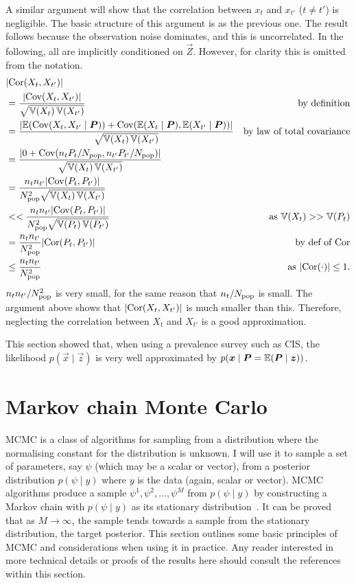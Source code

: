 \documentclass[thesis.tex]{subfiles}
\begin{document}
A similar argument will show that the correlation between $x_t$ and $x_{t'}$ ($t \neq t'$) is negligible.
The basic structure of this argument is as the previous one.
The result follows because the observation noise dominates, and this is uncorrelated.
In the following, all are implicitly conditioned on $\vec{Z}$.
However, for clarity this is omitted from the notation.
\begin{align}
  &\lvert \operatorname{Cor}(X_t, X_{t'}) \rvert \\
  &= \frac{\lvert\operatorname{Cov}(X_t, X_{t'})\rvert}{\sqrt{\operatorname{\mathbb{V}}(X_t) \operatorname{\mathbb{V}}(X_{t'})}} &\text{by definition}\\
  &= \frac{\lvert \operatorname{\mathbb{E}}(\operatorname{Cov}(X_t, X_{t'} \mid \bm{P})) + \operatorname{Cov}(\operatorname{\mathbb{E}}(X_t \mid \bm{P}), \operatorname{\mathbb{E}}(X_{t'} \mid \bm{P})) \rvert}{\sqrt{\operatorname{\mathbb{V}}(X_t) \operatorname{\mathbb{V}}(X_{t'})}} &\text{by law of total covariance} \\
  &= \frac{\lvert 0 + \operatorname{Cov}(n_t P_t / N_\text{pop}, n_{t'} P_{t'} / N_\text{pop}) \rvert}{\sqrt{\operatorname{\mathbb{V}}(X_t) \operatorname{\mathbb{V}}(X_{t'})}} \\
  &= \frac{n_t n_{t'} \lvert \operatorname{Cov}(P_t, P_{t'}) \rvert}{N_\text{pop}^2 \sqrt{\operatorname{\mathbb{V}}(X_t) \operatorname{\mathbb{V}}(X_{t'})}}  \\
  &<< \frac{n_t n_{t'} \lvert \operatorname{Cov}(P_t, P_{t'}) \rvert}{N_\text{pop}^2 \sqrt{\operatorname{\mathbb{V}}(P_t) \operatorname{\mathbb{V}}(P_{t'})}} &\text{as $\operatorname{\mathbb{V}}(X_t) >> \operatorname{\mathbb{V}}(P_t)$} \\
  &= \frac{n_t n_{t'}}{N_\text{pop}^2} \lvert \operatorname{Cor}(P_t, P_{t'}) \rvert &\text{by def of $\operatorname{Cor}$}\\
  &\leq \frac{n_t n_{t'}}{N_\text{pop}^2} &\text{as $\lvert \operatorname{Cor}(\cdot) \rvert \leq 1$}.
\end{align}
$n_t n_{t'} / N_\text{pop}^2$ is very small, for the same reason that $n_t / N_\text{pop}$ is small.
The argument above shows that $\lvert \operatorname{Cor}(X_t, X_{t'}) \rvert$ is much smaller than this.
Therefore, neglecting the correlation between $X_t$ and $X_{t'}$ is a good approximation.

This section showed that, when using a prevalence survey such as CIS, the likelihood $p(\vec{x} \mid \vec{z})$ is very well approximated by $p(\bm{x} \mid \bm{P} = \operatorname{\mathbb{E}}(\bm{P} \mid \bm{z}))$.


\section{Markov chain Monte Carlo} \label{inc-prev:sec:MCMC}

MCMC is a class of algorithms for sampling from a distribution where the normalising constant for the distribution is unknown.
I will use it to sample a set of parameters, say $\psi$ (which may be a scalar or vector), from a posterior distribution $p(\psi \mid y)$ where $y$ is the data (again, scalar or vector).
MCMC algorithms produce a sample $\psi^1, \psi^2, \dots, \psi^M$ from $p(\psi \mid y)$ by constructing a Markov chain with $p(\psi \mid y)$ as its stationary distribution~\autocite[275]{gelmanBDA}.
It can be proved that as $M\to\infty$, the sample tends towards a sample from the stationary distribution, \ie the target posterior.
This section outlines some basic principles of MCMC and considerations when using it in practice.
Any reader interested in more technical details or proofs of the results here should consult the references within this section.
\end{document}
